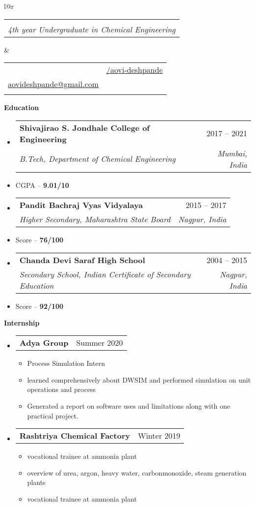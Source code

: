 \documentclass[letterpaper,12pt]{article}[leftmargin=*]
\makeatletter
\def \fullname {Aovi Deshpande}
\def \subtitle {4th year Undergraduate in Chemical Engineering}
\def \linkedinicon {\faLinkedin}
\def \linkedinlink {www.linkedin.com/in/aovi-deshpande-9b29a8185}
\def \linkedintext {/aovi-deshpande}
\def \phoneicon {\faPhone}
\def \phonetext {+91 8830167207}
\def \emailicon {\faEnvelope}
\def \emaillink {mailto:aovideshpande@gmail.com}
\def \emailtext {aovideshpande@gmail.com}
\def \headertype {\doublecol} %
\def \entryspacing {-0pt}
\def \linkedin {\linkedinicon \hspace{3pt}\href{\linkedinlink}{\linkedintext}}
\def \phone {\phoneicon \hspace{3pt}{ \phonetext}}
\def \email {\emailicon \hspace{3pt}\href{\emaillink}{\emailtext}}
\renewcommand{\section}[2]{\vspace{5pt}
  \colorbox{secondary}{\color{white}\raggedbottom\normalsize\textbf{{#1}{\hspace{7pt}#2}}}
}
\newcommand{\resumeEntryStart}{\begin{itemize}[leftmargin=2.5mm]}
\newcommand{\resumeEntryEnd}{\end{itemize}\vspace{\entryspacing}}
\newcommand{\resumeItemListStart}{\begin{itemize}[leftmargin=4.5mm]}
\newcommand{\resumeItemListEnd}{\end{itemize}}
\newcommand{\resumeItem}[1]{
  \item\small{
    {#1 \vspace{-2pt}}
  }
}
\newcommand{\resumeEntryTSDL}[4]{
  \vspace{-1pt}\item[]
    \begin{tabular*}{0.97\textwidth}{l@{\extracolsep{\fill}}r}
      \textbf{\color{primary}#1} & {\firabook\color{accent}\small#2} \\
      \textit{\color{accent}\small#3} & \textit{\color{accent}\small#4} \\
    \end{tabular*}\vspace{-6pt}
}
\newcommand{\resumeEntryTD}[2]{
  \vspace{-1pt}\item[]
    \begin{tabular*}{0.97\textwidth}{l@{\extracolsep{\fill}}r}
      \textbf{\color{primary}#1} & {\firabook\color{accent}\small#2} \\
    \end{tabular*}\vspace{-6pt}
}
\newcommand{\doublecol}[6]{
  \begin{tabular*}{\textwidth}{l@{\extracolsep{\fill}}r}
    {
      \begin{tabular}[c]{l}
        \fontsize{35}{45}\selectfont{\color{primary}{{\textbf{\fullname}}}} \\
        {\textit{\subtitle}} %
      \end{tabular}
    } & {
      \begin{tabular}[c]{l@{\hspace{1.5em}}l}
        {\small#4} & {\small#1} \\
        {\small#5} & {\small#2} \\
        {\small#6} & {\small#3}
      \end{tabular}
    }
  \end{tabular*}
}
\newcommand{\singlecol}[6]{
  \begin{tabular*}{\textwidth}{l@{\extracolsep{\fill}}r}
    {
      \begin{tabular}[b]{l}
        \fontsize{35}{45}\selectfont{\color{primary}{{\textbf{\fullname}}}} \\
        {\textit{\subtitle}} %
      \end{tabular}
    } & {
      \begin{tabular}[c]{l}
        {\small#1} \\
        {\small#2} \\
        {\small#3} \\
        {\small#4} \\
        {\small#5} \\
        {\small#6}
      \end{tabular}
    }
  \end{tabular*}
}
\makeatother
\begin{document}
\headertype{\linkedin}{}{}{\phone}{\email}{} %
\vspace{3pt} %

\section{\faGraduationCap}{Education}

\resumeEntryStart
  \resumeEntryTSDL
      {Shivajirao S. Jondhale College of Engineering}{2017 -- 2021}
      {B.Tech, Department of Chemical Engineering}{Mumbai, India}
     \item[]\small{\color{primary}CGPA -- { \textbf{9.01/10} \vspace{-6pt}}}
  \resumeEntryEnd
  \vspace{3pt}


\resumeEntryStart
  \resumeEntryTSDL
      {Pandit Bachraj Vyas Vidyalaya}{2015 -- 2017}
      {Higher Secondary, Maharashtra State Board}{Nagpur, India}
     \item[]\small{\color{primary}Score -- { \textbf{76/100} \vspace{-6pt}}}
  \resumeEntryEnd
  \vspace{3pt}


\resumeEntryStart
  \resumeEntryTSDL
      {Chanda Devi Saraf High School}{2004 -- 2015}
      {Secondary School, Indian Certificate of Secondary Education}{Nagpur, India}
     \item[]\small{\color{primary}Score -- { \textbf{92/100} \vspace{-6pt}}}
  \resumeEntryEnd
  \vspace{3pt}


  \vspace{4pt}
  
\section{\faTrophy}{Internship}

  \resumeEntryStart
      \resumeEntryTD
      {Adya Group}{Summer 2020}
    \resumeItemListStart
      \resumeItem{Process Simulation  Intern}
      \resumeItem{learned comprehensively about DWSIM and performed simulation on unit operations and process}
      \resumeItem{Generated a report on software uses and  limitations along with one practical project.}
    \resumeItemListEnd
  \resumeEntryEnd


  \resumeEntryStart
      \resumeEntryTD
      {Rashtriya Chemical Factory}{Winter 2019}
    \resumeItemListStart
      \resumeItem{vocational trainee at ammonia plant}
      \resumeItem{overview of urea, argon, heavy water, carbonmonoxide, steam generation plants}
      \resumeItem{vocational trainee at ammonia plant}
    \resumeItemListEnd
  \resumeEntryEnd
\end{document}

